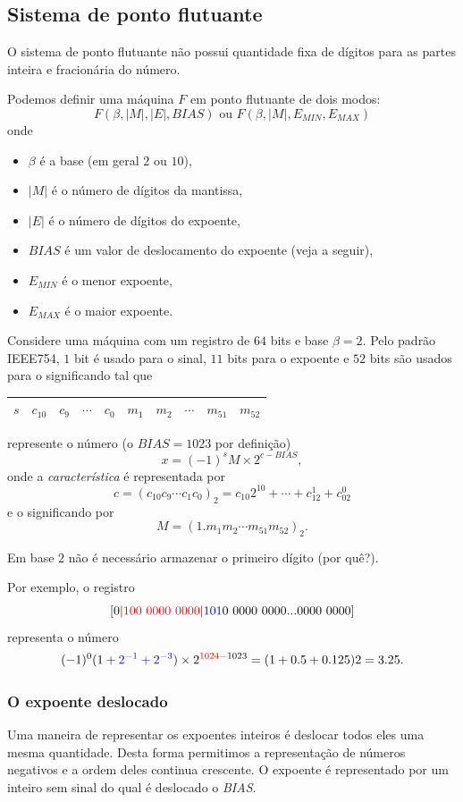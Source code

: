 \subsection{Sistema de ponto flutuante}

O sistema de ponto flutuante não possui quantidade fixa de dígitos para as partes inteira e fracionária do número. 

Podemos definir uma máquina $F$ em ponto flutuante de dois modos:
$$ F(\beta,|M|,|E|,BIAS) \text{ ou } F(\beta,|M|,E_{MIN},E_{MAX})$$
onde
\begin{itemize}
 \item $\beta$ é a base (em geral $2$ ou $10$),
 \item $|M|$ é o número de dígitos da mantissa,
 \item $|E|$ é o número de dígitos do expoente,
 \item $BIAS$ é um valor de deslocamento do expoente (veja a seguir),
 \item $E_{MIN}$ é o menor expoente,
 \item $E_{MAX}$ é o maior expoente.
\end{itemize}



Considere uma máquina com um registro de $64$ bits e base $\beta=2$. Pelo padrão IEEE754, $1$ bit é usado para o sinal, $11$ bits para o expoente e $52$ bits são usados para o significando tal que 
\begin{center}
  \begin{tabular}{|c|c|c|c|c|c|c|c|c|c|}\hline
    $s$ & $c_{10}$ & $c_{9}$ & $\cdots$ & $c_{0}$ & $m_1$ & $m_2$ & $\cdots$ & $m_{51}$ & $m_{52}$\\\hline
  \end{tabular}  
\end{center}
represente o número (o $BIAS=1023$ por definição)
$$ x=(-1)^{s}M \times 2^{c-BIAS},$$
onde a \emph{característica} é representada por
$$c=(c_{10}c_9\cdots c_1c_0)_2=c_{10}2^{10}+\cdots+c_12^1+c_02^0 $$
e o significando por
$$M=(1.m_1m_2\cdots m_{51}m_{52})_2.$$

Em base $2$ não é necessário armazenar o primeiro dígito (por quê?).

Por exemplo, o registro
$$
[0|{\color{red}{100~0000~0000}} |{\color{blue}{101}}0~0000~0000...0000~0000]
$$
representa o número
$$
(-1)^0(1+{\color{blue}{2^{-1}+2^{-3}}})\times  2^{{\color{red}{1024}}-1023}=(1+0.5+0.125)2=3.25.
$$



\subsubsection{O expoente deslocado}
Uma maneira de representar os expoentes inteiros é deslocar todos eles uma mesma quantidade. Desta forma permitimos a representação de números negativos e a ordem deles continua crescente. O expoente é representado por um inteiro sem sinal do qual é deslocado o \emph{BIAS}.

